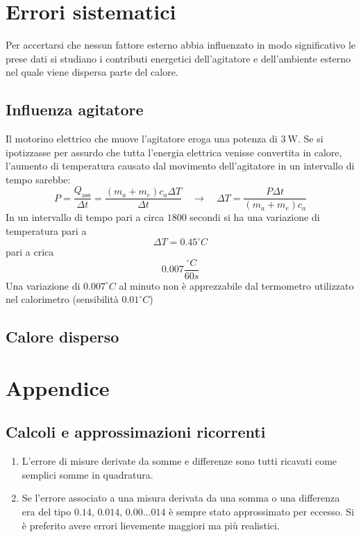 \documentclass{article}
\begin{document}
 

	
	
	\section{Errori sistematici}
	Per accertarsi che nessun fattore esterno abbia influenzato in modo significativo le prese dati si studiano i contributi energetici dell'agitatore e dell'ambiente esterno nel quale viene dispersa parte del calore.
	
	\subsection{Influenza agitatore}
	
	
	Il motorino elettrico che muove l'agitatore eroga una potenza di \(\SI{3}{\watt}\). Se si ipotizzasse per assurdo che tutta l’energia elettrica venisse convertita in calore, l'aumento di temperatura causato dal movimento dell’agitatore in un intervallo di tempo sarebbe:
	\[ 
	P = \frac{Q_{\text{ass}}}{\Delta t} = \frac{(m_{a} + m_{e})c_{a}\Delta T}{\Delta t} \quad \to \quad \Delta T = \frac{P\Delta t}{(m_{a} + m_{e})c_{a}}
	\]
	In un intervallo di tempo pari a circa \(1800\) secondi si ha una variazione di temperatura pari a 
	\[ 
	\Delta T = 0.45 ^\circ C 
	\]
	pari a crica 
	\[
	0.007 \frac{^\circ C}{60 s}
	\]
	Una variazione di \(0.007 ^\circ C\) al minuto non è apprezzabile dal termometro utilizzato nel calorimetro (sensibilità \(0.01^\circ C\))
	\subsection{Calore disperso}
	
	\newpage
	\section{Appendice}
	\subsection{Calcoli e approssimazioni ricorrenti}
	\begin{enumerate}
		\item L'errore di misure derivate da somme e differenze sono tutti ricavati come semplici somme in quadratura.
		\item Se l'errore associato a una misura derivata da una somma o una differenza era del tipo \(0.14\), \(0.014\), \(0.00\dots 014\) è sempre stato approssimato per eccesso. Si è preferito avere errori lievemente maggiori ma più realistici.
	\end{enumerate}
	
\end{document}
